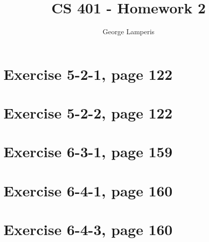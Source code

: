 \documentclass[letterpaper, 12pt, oneside]{memoir}
\title{CS 401 - Homework 2}
\author{George Lamperis}
\date{}
\begin{document}
\maketitle


\section*{Exercise 5-2-1, page 122}


\section*{Exercise 5-2-2, page 122}


\section*{Exercise 6-3-1, page 159}


\section*{Exercise 6-4-1, page 160}


\section*{Exercise 6-4-3, page 160}
\end{document}
